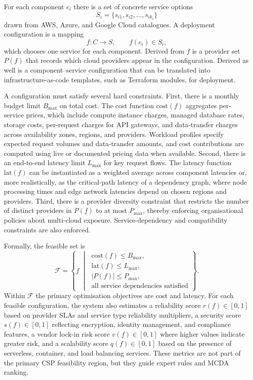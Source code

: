 \documentclass[journal]{IEEEtran}
\begin{document}
For each component $c_i$ there is a set of concrete service options
\begin{equation}
  S_i = \{s_{i1}, s_{i2}, \ldots, s_{ik_i}\}  \label{eq:options}
\end{equation}
drawn from AWS, Azure, and Google Cloud catalogues. A deployment configuration
is a mapping
\begin{equation}
  f : C \to S, \qquad f(c_i) \in S_i,  \label{eq:config}
\end{equation}
which chooses one service for each component. Derived from $f$ is a provider
set $P(f)$ that records which cloud providers appear in the configuration.
Derived as well is a component--service configuration that can be translated
into infrastructure-as-code templates, such as Terraform modules, for
deployment.

A configuration must satisfy several hard constraints. First, there is a
monthly budget limit $B_{\max}$ on total cost. The cost function
$\mathrm{cost}(f)$ aggregates per-service prices, which include compute
instance charges, managed database rates, storage costs, per-request charges
for API gateways, and data-transfer charges across availability zones, regions,
and providers. Workload profiles specify expected request volumes and
data-transfer amounts, and cost contributions are computed using live or
documented pricing data when available. Second, there is an end-to-end latency
limit $L_{\max}$ for key request flows. The latency function $\mathrm{lat}(f)$
can be instantiated as a weighted average across component latencies or, more
realistically, as the critical-path latency of a dependency graph, where node
processing times and edge network latencies depend on chosen regions and
providers. Third, there is a provider diversity constraint that restricts the
number of distinct providers in $P(f)$ to at most $P_{\max}$, thereby enforcing
organisational policies about multi-cloud exposure. Service-dependency and
compatibility constraints are also enforced.

Formally, the feasible set is
\begin{equation}
  \mathcal{F} = \left\{ f \;\middle|\;
  \begin{array}{l}
    \mathrm{cost}(f) \le B_{\max}, \\
    \mathrm{lat}(f) \le L_{\max}, \\
    |P(f)| \le P_{\max}, \\
    \text{all service dependencies satisfied}
  \end{array}
  \right\}.  \label{eq:feasible}
\end{equation}
Within $\mathcal{F}$ the primary optimisation objectives are cost and latency.
For each feasible configuration, the system also estimates a reliability score
$r(f) \in [0,1]$ based on provider SLAs and service type reliability
multipliers, a security score $s(f) \in [0,1]$ reflecting encryption, identity
management, and compliance features, a vendor lock-in risk score
$v(f) \in [0,1]$ where higher values indicate greater risk, and a scalability
score $q(f) \in [0,1]$ based on the presence of serverless, container, and
load balancing services. These metrics are not part of the primary CSP
feasibility region, but they guide expert rules and MCDA ranking.
\end{document}
